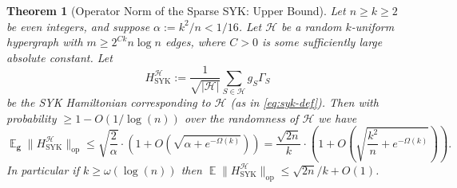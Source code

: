 \documentclass
[11pt,letterpaper]
{article}
\newtheorem{theorem}{Theorem}[section]
\theoremstyle{definition}
\newcommand{\1}{\mathbf{1}}
\newcommand{\cH}{\mathcal H}
\DeclareMathOperator*{\E}{\mathbb{E}}
\renewcommand{\geq}{\geqslant}
\renewcommand{\leq}{\leqslant}
\begin{document}
\begin{theorem}[Operator Norm of the Sparse SYK: Upper Bound]\label{thm:syk-spectral-norm-random}
    Let $n\geq k\geq 2$ be even integers, and suppose $\alpha:= k^2/n < 1/16$.  Let $\cH$ be a random $k$-uniform hypergraph with $m\geq 2^{Ck}n\log n$ edges, where $C > 0$ is some sufficiently large absolute constant. Let 
    \[H^\cH_{\operatorname{SYK}}:= \frac{1}{\sqrt{|\cH|}}\sum_{S\in\cH}g_S\Gamma_S\]
    be the SYK Hamiltonian corresponding to $\cH$ (as in \cref{eq:syk-def}). Then with probability $\geq 1 - O(1/\log(n))$ over the randomness of $\cH$ we have 
    \[\E_{\bm g}\|H^\cH_{\operatorname{SYK}}\|_{\operatorname{op}}\leq \sqrt{\frac{2}{\alpha}}\cdot\left(1 + O\left(\sqrt{\alpha + e^{-\Omega(k)}}\right)\right) = \frac{\sqrt{2n}}{k}\cdot\left(1 + O\left(\sqrt{\frac{k^2}{n} + e^{-\Omega(k)}}\right)\right).\]
    In particular if $k\geq\omega(\log(n))$ then $\E\|H^\cH_{\operatorname{SYK}}\|_{\operatorname{op}}\leq \sqrt{2n}/k + O(1)$.
\end{theorem}
\end{document}
